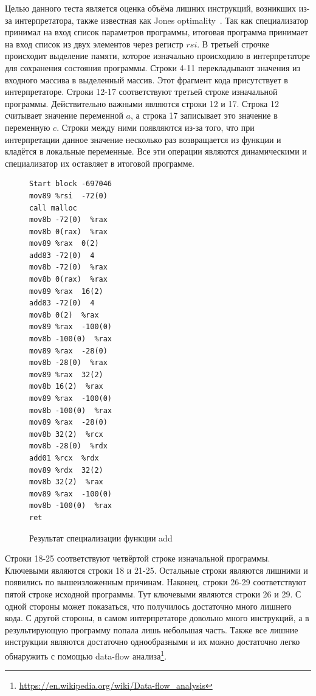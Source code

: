 Целью данного теста является оценка объёма лишних инструкций, возникших из-за интерпретатора, также известная как Jones optimality~\cite{optimal}. Так как специализатор принимал на вход список параметров программы, итоговая программа принимает на вход список из двух элементов через регистр $rsi$. В третьей строчке происходит выделение памяти, которое изначально происходило в интерпретаторе для сохранения состояния программы. Строки 4-11 перекладывают значения из входного массива в выделенный массив. Этот фрагмент кода присутствует в интерпретаторе. Строки 12-17 соответствуют третьей строке изначальной программы. Действительно важными являются строки 12 и 17. Строка 12 считывает значение переменной $a$, а строка 17 записывает это значение в переменную $c$. Строки между ними появляются из-за того, что при интерпретации данное значение несколько раз возвращается из функции и кладётся в локальные переменные. Все эти операции являются динамическими и специализатор их оставляет в итоговой программе. 

\begin{figure}[t]
\begin{multicols}{2}
\begin{lstlisting}
Start block -697046
mov89 %rsi  -72(0) 
call malloc
mov8b -72(0)  %rax
mov8b 0(rax)  %rax
mov89 %rax  0(2)
add83 -72(0)  4
mov8b -72(0)  %rax
mov8b 0(rax)  %rax
mov89 %rax  16(2)
add83 -72(0)  4
mov8b 0(2)  %rax 
mov89 %rax  -100(0) 
mov8b -100(0)  %rax 
mov89 %rax  -28(0) 
mov8b -28(0)  %rax 
mov89 %rax  32(2)
mov8b 16(2)  %rax 
mov89 %rax  -100(0) 
mov8b -100(0)  %rax 
mov89 %rax  -28(0) 
mov8b 32(2)  %rcx 
mov8b -28(0)  %rdx 
add01 %rcx  %rdx 
mov89 %rdx  32(2) 
mov8b 32(2)  %rax 
mov89 %rax  -100(0) 
mov8b -100(0)  %rax 
ret
\end{lstlisting}
\end{multicols}
\caption{Результат специализации функции add}
\label{fig:specadd}
\end{figure}

Строки 18-25 соответствуют четвёртой строке изначальной программы. Ключевыми являются строки 18 и 21-25. Остальные строки являются лишними и появились по вышеизложенным причинам. Наконец, строки 26-29 соответствуют пятой строке исходной программы. Тут ключевыми являются строки 26 и 29. С одной стороны может показаться, что получилось достаточно много лишнего кода. С другой стороны, в самом интерпретаторе довольно много инструкций, а в результирующую программу попала лишь небольшая часть. Также все лишние инструкции являются достаточно однообразными и их можно достаточно легко обнаружить с помощью data-flow анализа\footnote{\url{https://en.wikipedia.org/wiki/Data-flow_analysis}}.


